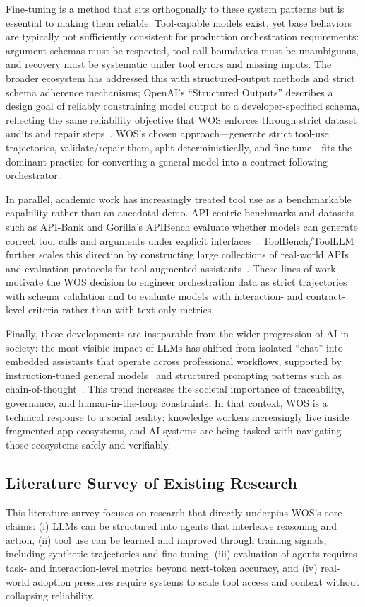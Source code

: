 \documentclass[conference]{IEEEtran}
\begin{document}
Fine-tuning is a method that sits orthogonally to these system patterns but is essential to making them reliable. Tool-capable models exist, yet base behaviors are typically not sufficiently consistent for production orchestration requirements: argument schemas must be respected, tool-call boundaries must be unambiguous, and recovery must be systematic under tool errors and missing inputs. The broader ecosystem has addressed this with structured-output methods and strict schema adherence mechanisms; OpenAI’s “Structured Outputs” describes a design goal of reliably constraining model output to a developer-specified schema, reflecting the same reliability objective that WOS enforces through strict dataset audits and repair steps~\cite{openai_structured_outputs}. WOS’s chosen approach—generate strict tool-use trajectories, validate/repair them, split deterministically, and fine-tune—fits the dominant practice for converting a general model into a contract-following orchestrator.

In parallel, academic work has increasingly treated tool use as a benchmarkable capability rather than an anecdotal demo. API-centric benchmarks and datasets such as API-Bank and Gorilla’s APIBench evaluate whether models can generate correct tool calls and arguments under explicit interfaces~\cite{li-etal-2023-api,patil2023gorilla}. ToolBench/ToolLLM further scales this direction by constructing large collections of real-world APIs and evaluation protocols for tool-augmented assistants~\cite{qiao2023toolllm}. These lines of work motivate the WOS decision to engineer orchestration data as strict trajectories with schema validation and to evaluate models with interaction- and contract-level criteria rather than with text-only metrics.

Finally, these developments are inseparable from the wider progression of AI in society: the most visible impact of LLMs has shifted from isolated “chat” into embedded assistants that operate across professional workflows, supported by instruction-tuned general models~\cite{ouyang2022training} and structured prompting patterns such as chain-of-thought~\cite{wei2022chain}. This trend increases the societal importance of traceability, governance, and human-in-the-loop constraints. In that context, WOS is a technical response to a social reality: knowledge workers increasingly live inside fragmented app ecosystems, and AI systems are being tasked with navigating those ecosystems safely and verifiably.
\subsection{Literature Survey of Existing Research}
This literature survey focuses on research that directly underpins WOS’s core claims: (i) LLMs can be structured into agents that interleave reasoning and action, (ii) tool use can be learned and improved through training signals, including synthetic trajectories and fine-tuning, (iii) evaluation of agents requires task- and interaction-level metrics beyond next-token accuracy, and (iv) real-world adoption pressures require systems to scale tool access and context without collapsing reliability.
\end{document}

